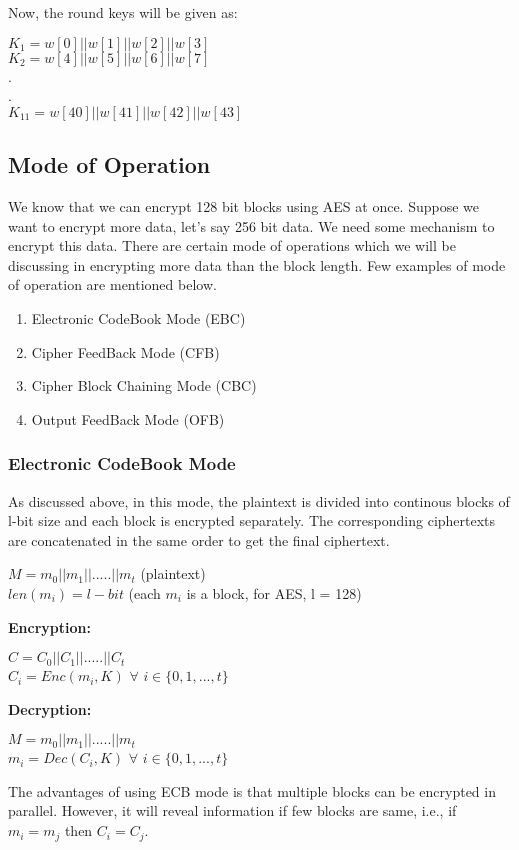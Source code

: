 \documentclass[11pt]{article}
\begin{document}
Now, the round keys will be given as:
\begin{center}
    $K_1 = w[0] || w[1] || w[2] || w[3]$\\
    \vspace{1mm}
    $K_2 = w[4] || w[5] || w[6] || w[7]$\\
    \vspace{1mm}
    .\\
    .\\
    $K_{11} = w[40] || w[41] || w[42] || w[43]$\\
    \vspace{1mm}
\end{center}

\subsection*{Mode of Operation}
We know that we can encrypt 128 bit blocks using AES at once. Suppose we want to encrypt more data, let's say 256 bit data. We need some mechanism to encrypt this data. There are certain mode of operations which we will be discussing in encrypting more data than the block length. Few examples of mode of operation are mentioned below.
\begin{enumerate}
    \item Electronic CodeBook Mode (EBC)
    \item Cipher FeedBack Mode (CFB)
    \item Cipher Block Chaining Mode (CBC)
    \item Output FeedBack Mode (OFB)
\end{enumerate}
\newline


\subsubsection*{Electronic CodeBook Mode}
As discussed above, in this mode, the plaintext is divided into continous blocks of l-bit size and each block is encrypted separately. The corresponding ciphertexts are concatenated in the same order to get the final ciphertext.
\begin{center}
    $M = m_0 || m_1 || ..... || m_t$ (plaintext)\\
    $len(m_i) = l-bit$ (each $m_i$ is a block, for AES, l = 128)
\end{center} 
\textbf{Encryption:}
\begin{center}
    $C = C_0 || C_1 || ..... || C_t$\\
    $C_i = Enc(m_i, K)$ $\forall$ $i \in \{0,1,...,t\}$
\end{center}
\textbf{Decryption:}
\begin{center}
    $M = m_0 || m_1 || ..... || m_t$\\
    $m_i = Dec(C_i, K)$ $\forall$ $i \in \{0,1,...,t\}$
\end{center}
The advantages of using ECB mode is that multiple blocks can be encrypted in parallel. However, it will reveal information if few blocks are same, i.e., if $m_i = m_j$ then $C_i = C_j$.
\end{document}
